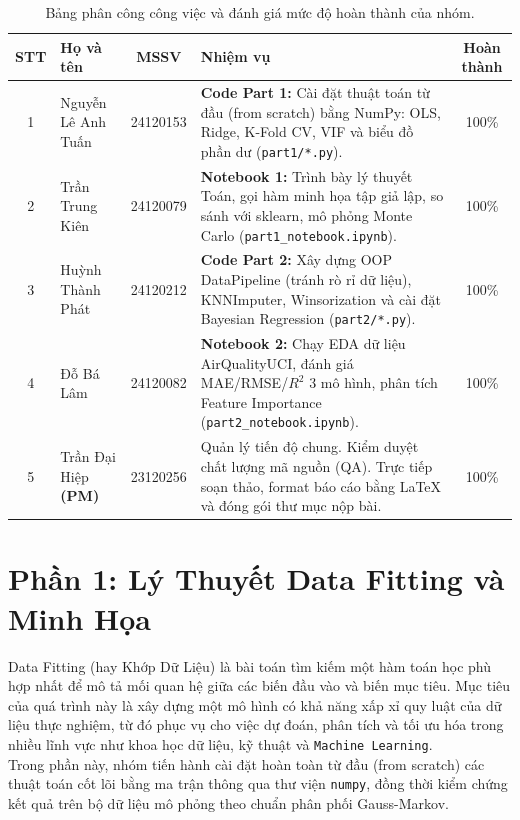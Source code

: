 \documentclass[12pt,a4paper]{article}
\begin{document}
\begin{table}[H]
    \centering
    \renewcommand{\arraystretch}{1.5}
    \begin{tabular}{|c|p{3.5cm}|c|p{7cm}|c|}
        \hline
        \textbf{STT} & \textbf{Họ và tên} & \textbf{MSSV} & \textbf{Nhiệm vụ} & \textbf{Hoàn thành} \\
        \hline
        1 & Nguyễn Lê Anh Tuấn & 24120153 & \textbf{Code Part 1:} Cài đặt thuật toán từ đầu (from scratch) bằng NumPy: OLS, Ridge, K-Fold CV, VIF và biểu đồ phần dư (\texttt{part1/*.py}). & 100\% \\
        \hline
        2 & Trần Trung Kiên  & 24120079 & \textbf{Notebook 1:} Trình bày lý thuyết Toán, gọi hàm minh họa tập giả lập, so sánh với sklearn, mô phỏng Monte Carlo (\texttt{part1\_notebook.ipynb}). & 100\% \\
        \hline
        3 & Huỳnh Thành Phát & 24120212 & \textbf{Code Part 2:} Xây dựng OOP DataPipeline (tránh rò rỉ dữ liệu), KNNImputer, Winsorization và cài đặt Bayesian Regression (\texttt{part2/*.py}). & 100\% \\
        \hline
        4 & Đỗ Bá Lâm & 24120082 & \textbf{Notebook 2:} Chạy EDA dữ liệu AirQualityUCI, đánh giá MAE/RMSE/$R^2$ 3 mô hình, phân tích Feature Importance (\texttt{part2\_notebook.ipynb}). & 100\% \\
        \hline
        5 & Trần Đại Hiệp \textbf{(PM)} & 23120256 & Quản lý tiến độ chung. Kiểm duyệt chất lượng mã nguồn (QA). Trực tiếp soạn thảo, format báo cáo bằng LaTeX và đóng gói thư mục nộp bài. & 100\% \\
        \hline
    \end{tabular}
    \caption{Bảng phân công công việc và đánh giá mức độ hoàn thành của nhóm.}
    \label{tab:phan_cong}
\end{table}

\newpage


\section{Phần 1: Lý Thuyết Data Fitting và Minh Họa}

Data Fitting (hay Khớp Dữ Liệu) là bài toán tìm kiếm một hàm toán học phù hợp nhất để mô tả mối quan hệ giữa các biến đầu vào và biến mục tiêu. Mục tiêu của quá trình này là xây dựng một mô hình có khả năng xấp xỉ quy luật của dữ liệu thực nghiệm, từ đó phục vụ cho việc dự đoán, phân tích và tối ưu hóa trong nhiều lĩnh vực như khoa học dữ liệu, kỹ thuật và \texttt{Machine Learning}. \\ 
Trong phần này, nhóm tiến hành cài đặt hoàn toàn từ đầu (from scratch) các thuật toán cốt lõi bằng ma trận thông qua thư viện \texttt{numpy}, đồng thời kiểm chứng kết quả trên bộ dữ liệu mô phỏng theo chuẩn phân phối Gauss-Markov.
\end{document}
